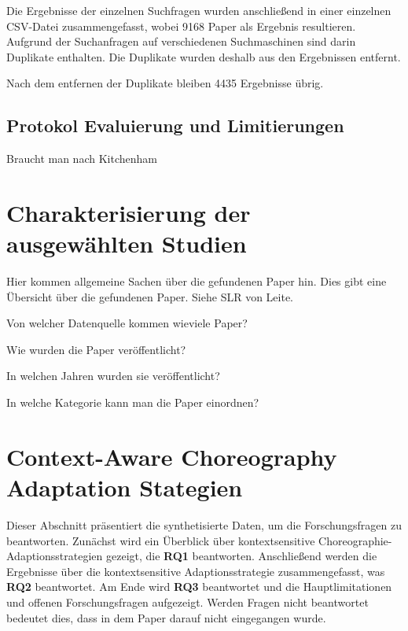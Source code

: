 \documentclass[conference,compsoc]{IEEEtran}
\begin{document}
Die Ergebnisse der einzelnen Suchfragen wurden anschließend in einer einzelnen CSV-Datei zusammengefasst, wobei 9168 Paper als Ergebnis resultieren. Aufgrund der Suchanfragen auf verschiedenen Suchmaschinen sind darin Duplikate enthalten. Die Duplikate wurden deshalb aus den Ergebnissen entfernt.


Nach dem entfernen der Duplikate bleiben 4435 Ergebnisse übrig.

\subsection{Protokol Evaluierung und Limitierungen}
Braucht man nach Kitchenham

\section{Charakterisierung der ausgewählten Studien}
Hier kommen allgemeine Sachen über die gefundenen Paper hin. Dies gibt eine Übersicht über die gefundenen Paper. Siehe SLR von Leite\cite{leite2013systematic}.

Von welcher Datenquelle kommen wieviele Paper?

Wie wurden die Paper veröffentlicht?

In welchen Jahren wurden sie veröffentlicht?

In welche Kategorie kann man die Paper einordnen?

\section{Context-Aware Choreography Adaptation Stategien}
Dieser Abschnitt präsentiert die synthetisierte Daten, um die Forschungsfragen zu beantworten. Zunächst wird ein Überblick über  kontextsensitive Choreographie-Adaptionsstrategien gezeigt, die \textbf{RQ1} beantworten. Anschließend werden die Ergebnisse über die kontextsensitive Adaptionsstrategie zusammengefasst, was \textbf{RQ2} beantwortet. Am Ende wird \textbf{RQ3} beantwortet und die Hauptlimitationen und offenen Forschungsfragen aufgezeigt.
Werden Fragen nicht beantwortet bedeutet dies, dass in dem Paper darauf nicht eingegangen wurde.
\end{document}
